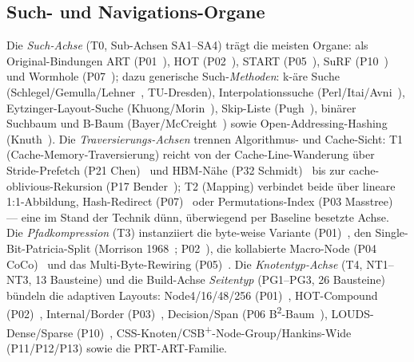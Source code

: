 \subsection{Such- und Navigations-Organe}\label{ssec:sota-ax-nav}
Die \emph{Such-Achse} (T0, Sub-Achsen SA1--SA4) trägt die meisten Organe: als Original-Bindungen ART
(P01~\cite{leis2013art}), HOT (P02~\cite{binna2018hot}), START (P05~\cite{fent2020start}), SuRF
(P10~\cite{zhang2018surf}) und Wormhole (P07~\cite{wu2019wormhole}); dazu generische
Such-\emph{Methoden}: k-äre Suche (Schlegel/Gemulla/Lehner~\cite{schlegel2009kary}, TU-Dresden),
Interpolationssuche (Perl/Itai/Avni~\cite{perl1978interpolation}), Eytzinger-Layout-Suche
(Khuong/Morin~\cite{khuong2017eytzinger}), Skip-Liste (Pugh~\cite{pugh1990skiplist}), binärer
Suchbaum und B-Baum (Bayer/McCreight~\cite{bayer1972btree}) sowie Open-Addressing-Hashing
(Knuth~\cite{knuth1998taocp3}). Die \emph{Traversierungs-Achsen} trennen Algorithmus- und
Cache-Sicht: T1 (Cache-Memory-Traversierung) reicht von der Cache-Line-Wanderung über
Stride-Prefetch (P21 Chen)~\cite{chen2001prefetch} und HBM-Nähe (P32 Schmidt)~\cite{schmidt2025hbm}
bis zur cache-oblivious-Rekursion (P17 Bender~\cite{frigo1999cache}); T2 (Mapping) verbindet beide
über lineare 1:1-Abbildung, Hash-Redirect (P07)~\cite{wu2019wormhole} oder Permutations-Index (P03
Masstree)~\cite{mao2012masstree} --- eine im Stand der Technik dünn, überwiegend per Baseline
besetzte Achse. Die \emph{Pfadkompression} (T3) instanziiert die byte-weise Variante
(P01)~\cite{leis2013art}, den Single-Bit-Patricia-Split (Morrison 1968~\cite{morrison1968patricia};
P02~\cite{binna2018hot}), die kollabierte Macro-Node (P04 CoCo)~\cite{boffa2024coco} und das
Multi-Byte-Rewiring (P05)~\cite{fent2020start}. Die \emph{Knotentyp-Achse} (T4, NT1--NT3, 13
Bausteine) und die Build-Achse \emph{Seitentyp} (PG1--PG3, 26 Bausteine) bündeln die adaptiven
Layouts: Node4/16/48/256 (P01)~\cite{leis2013art}, HOT-Compound (P02)~\cite{binna2018hot},
Internal/Border (P03)~\cite{mao2012masstree}, Decision/Span (P06
B\textsuperscript{2}-Baum~\cite{schmeisser2022b2tree}), LOUDS-Dense/Sparse
(P10)~\cite{zhang2018surf}, CSS-Knoten/CSB\textsuperscript{+}-Node-Group/Hankins-Wide (P11/P12/P13)
sowie die PRT-ART-Familie.

